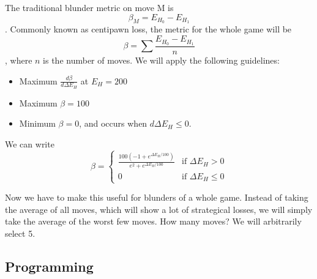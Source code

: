 \documentclass{article}
\begin{document}
The traditional blunder metric on move M is \[\beta_M=E_{H_0}-E_{H_1}\]. Commonly known as centipawn loss, the metric for the whole game will be \[\beta=\sum \frac{E_{H_0}-E_{H_1}}{n}\], where $n$ is the number of moves. We will apply the following guidelines:
\begin{itemize}
  \item Maximum $\frac{d\beta}{d\Delta E_H}$ at $E_H = 200$
  \item Maximum $\beta=100$
  \item Minimum $\beta=0$, and occurs when $d\Delta E_H\leq 0$.
\end{itemize}

We can write 
\begin{equation*}
\beta =
\begin{cases}
\frac{100 (-1 + e^{\Delta E_H/100})}{e^2 + e^{\Delta E_H/100}} & \text{if } \Delta E_H > 0 \\
0 & \text{if } \Delta E_H \leq 0 
\end{cases}
\end{equation*}

Now we have to make this useful for blunders of a whole game. Instead of taking the average of all moves, which will show a lot of strategical losses, we will simply take the average of the worst few moves. How many moves? We will arbitrarily select 5.

\subsection{Programming}
\end{document}

